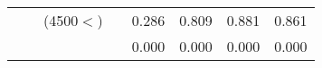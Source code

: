 \begin{table}[p]
\begin{tabular}{cclcllll}
                                                               &                                                                 & (4500$<$)                                                              &                                                                        &  0.286                                     & 0.809                                             & 0.881                                              & 0.861  \\ 
                                                               &                                                                 &                                                                                &                                                                        &  0.000                                      & 0.000                                            & 0.000                                              & 0.000  \\  
 \bottomrule
\end{tabular}
\label{app:Step-wise julian date}
\end{table}
